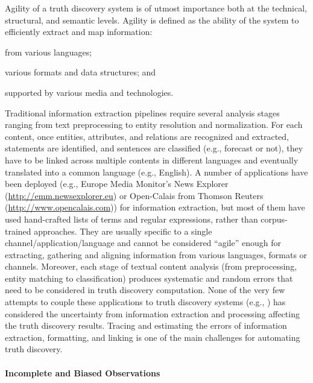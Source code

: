 \documentclass[prodmode,acmtecs]{acmsmall} %
\begin{document}
Agility of a truth discovery system is of utmost importance both at the technical, structural, and semantic levels. Agility is 
defined as the ability of the system to efficiently extract and map information: 
\begin{inparaenum}[(i)]
\item from various languages;
\item various formats and data structures; and
\item supported by various media and technologies.
\end{inparaenum}
Traditional information extraction
pipelines  require several analysis stages ranging from text preprocessing to entity resolution and normalization.  
For each content, once entities, attributes, and relations are recognized and extracted, statements are identified, and sentences are
classified (e.g., forecast or not), they have to be linked across multiple contents in different languages and eventually translated into
a common language (e.g., English). A number of applications have been deployed (e.g., Europe Media Monitor's News Explorer (\url{http://emm.newsexplorer.eu}) 
or Open-Calais from Thomson Reuters (\url{http://www.opencalais.com}))  
for information extraction, but most of them have used hand-crafted lists of terms and regular expressions, rather than corpus-trained approaches. They 
are usually specific to a single channel/application/language and cannot be considered ``agile'' enough for extracting, gathering and aligning information
from various languages, formats or channels.  Moreover, each stage of textual content analysis (from preprocessing, entity matching to classification) produces
systematic and random errors that need to be considered in truth discovery computation. None of the very few attempts  to couple these applications to truth discovery
systems (e.g., \cite{GoasdoueKKLMZ13}) has considered the uncertainty from information extraction and processing affecting the truth discovery results. Tracing and estimating 
the errors of information extraction, formatting, and linking  is one of the main challenges for automating truth discovery. 



\paragraph*{Incomplete and Biased Observations}  
\end{document}
